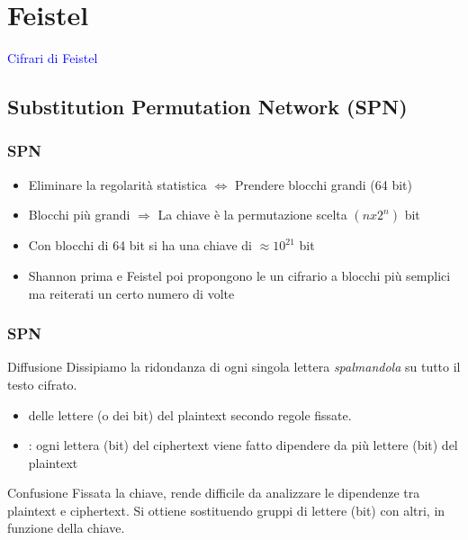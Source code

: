 \section{Feistel}

	\begin{frame}
		\begin{center}
			\LARGE{\textcolor{blue}{Cifrari di Feistel}}
		\end{center}
	\end{frame}
	
	\subsection{Substitution Permutation Network (SPN)}
	
	\begin{frame}
		\frametitle{SPN}		
		\begin{itemize}
			\item Eliminare la regolarità statistica $\Leftrightarrow$ Prendere blocchi grandi (64 bit)
			\item Blocchi più grandi $\Rightarrow$ La chiave è la permutazione scelta $(nx2^n)$ bit 
			\item Con blocchi di 64 bit si ha una chiave di $\approx 10^{21}$ bit
			\item Shannon prima e Feistel poi propongono le  un cifrario a blocchi più semplici ma reiterati un certo numero di volte 
		\end{itemize}
	\end{frame}

	\begin{frame}
	\frametitle{SPN}
	{	
		\fontsize{10}{0}	
		\begin{block}{Diffusione}
			Dissipiamo la ridondanza di ogni singola lettera \emph{spalmandola} su tutto il testo cifrato.
			\begin{itemize}
				\item {} delle lettere (o dei bit) del plaintext secondo regole fissate.
				\item {}: ogni lettera (bit) del ciphertext viene fatto dipendere da più lettere (bit) del plaintext
			\end{itemize}
		\end{block}
		\begin{block}{Confusione}
			Fissata la chiave, rende difficile da analizzare le dipendenze tra plaintext e ciphertext. Si ottiene sostituendo gruppi di lettere (bit) con altri, in funzione della chiave.
		\end{block}
	}
	\end{frame}
	
